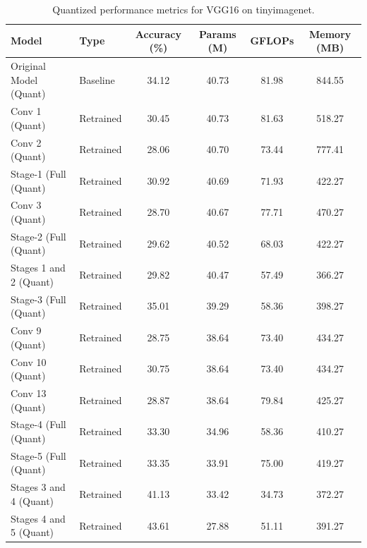\begin{table}
\caption{Quantized performance metrics for VGG16 on tinyimagenet.}
\label{tab:VGG16_tinyimagenet_quant}
\begin{tabular}{llcccc}
\toprule
Model & Type & Accuracy (\%) & Params (M) & GFLOPs & Memory (MB) \\
\midrule
Original Model
(Quant) & Baseline & 34.12 & 40.73 & 81.98 & 844.55 \\
Conv 1
(Quant) & Retrained & 30.45 & 40.73 & 81.63 & 518.27 \\
Conv 2
(Quant) & Retrained & 28.06 & 40.70 & 73.44 & 777.41 \\
Stage-1 (Full
(Quant) & Retrained & 30.92 & 40.69 & 71.93 & 422.27 \\
Conv 3
(Quant) & Retrained & 28.70 & 40.67 & 77.71 & 470.27 \\
Stage-2 (Full
(Quant) & Retrained & 29.62 & 40.52 & 68.03 & 422.27 \\
Stages 1 and 2
(Quant) & Retrained & 29.82 & 40.47 & 57.49 & 366.27 \\
Stage-3 (Full
(Quant) & Retrained & 35.01 & 39.29 & 58.36 & 398.27 \\
Conv 9
(Quant) & Retrained & 28.75 & 38.64 & 73.40 & 434.27 \\
Conv 10
(Quant) & Retrained & 30.75 & 38.64 & 73.40 & 434.27 \\
Conv 13
(Quant) & Retrained & 28.87 & 38.64 & 79.84 & 425.27 \\
Stage-4 (Full
(Quant) & Retrained & 33.30 & 34.96 & 58.36 & 410.27 \\
Stage-5 (Full
(Quant) & Retrained & 33.35 & 33.91 & 75.00 & 419.27 \\
Stages 3 and 4
(Quant) & Retrained & 41.13 & 33.42 & 34.73 & 372.27 \\
Stages 4 and 5
(Quant) & Retrained & 43.61 & 27.88 & 51.11 & 391.27 \\
\bottomrule
\end{tabular}
\end{table}
